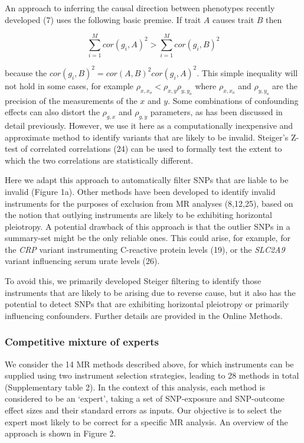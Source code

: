 \documentclass[]{article}
\begin{document}
An approach to inferring the causal direction between phenotypes
recently developed (7) uses the following basic premise. If trait \(A\)
causes trait \(B\) then

\[
\sum^M_{i=1}{cor(g_{i}, A)^2} > \sum^M_{i=1}{cor(g_{i}, B)^2}
\]

because the \(cor(g_{i}, B)^2 = cor(A, B)^{2} cor(g_{i}, A)^{2}\). This
simple inequality will not hold in some cases, for example
\(\rho_{x, x_o} < \rho_{x,y}\rho_{y,y_o}\) where \(\rho_{x, x_o}\) and
\(\rho_{y, y_o}\) are the precision of the measurements of the \(x\) and
\(y\). Some combinations of confounding effects can also distort the
\(\rho_{g,x}\) and \(\rho_{g,y}\) parameters, as has been discussed in
detail previously. However, we use it here as a computationally
inexpensive and approximate method to identify variants that are likely
to be invalid. Steiger's Z-test of correlated correlations (24) can be
used to formally test the extent to which the two correlations are
statistically different.

Here we adapt this approach to automatically filter SNPs that are liable
to be invalid (Figure 1a). Other methods have been developed to identify
invalid instruments for the purposes of exclusion from MR analyses
(8,12,25), based on the notion that outlying instruments are likely to
be exhibiting horizontal pleiotropy. A potential drawback of this
approach is that the outlier SNPs in a summary-set might be the only
reliable ones. This could arise, for example, for the \emph{CRP} variant
instrumenting C-reactive protein levels (19), or the \emph{SLC2A9}
variant influencing serum urate levels (26).

To avoid this, we primarily developed Steiger filtering to identify
those instruments that are likely to be arising due to reverse cause,
but it also has the potential to detect SNPs that are exhibiting
horizontal pleiotropy or primarily influencing confounders. Further
details are provided in the Online Methods.

\subsubsection{Competitive mixture of
experts}\label{competitive-mixture-of-experts}

We consider the 14 MR methods described above, for which instruments can
be supplied using two instrument selection strategies, leading to 28
methods in total (Supplementary table 2). In the context of this
analysis, each method is considered to be an `expert', taking a set of
SNP-exposure and SNP-outcome effect sizes and their standard errors as
inputs. Our objective is to select the expert most likely to be correct
for a specific MR analysis. An overview of the approach is shown in
Figure 2.
\end{document}
